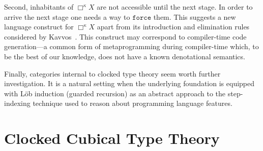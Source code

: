\documentclass[a4paper,UKenglish,numberwithinsect,cleveref,thm-restate]{lipics-v2021}
\numberwithin{equation}{section}
\theoremstyle{plain}
\begin{document}
Second, inhabitants of $\Box^\kappa X$ are not accessible until the next stage. In order to arrive the next stage one needs a way to $\mathtt{force}$ them. 
This suggests a new language construct for $\Box^\kappa X$ apart from its introduction and elimination rules considered by Kavvos~\cite{Kavvos2017a}.
This construct may correspond to compiler-time code generation---a common form of metaprogramming during compiler-time which, to be the best of our knowledge, does not have a known denotational semantics.

Finally, categories internal to clocked type theory seem worth further investigation.
It is a natural setting when the underlying foundation is equipped with Löb induction (guarded recursion) as an abstract approach to the step-indexing technique used to reason about programming language features.


%
%  



\appendix

\section{Clocked Cubical Type Theory}

%
%
%
\end{document}
